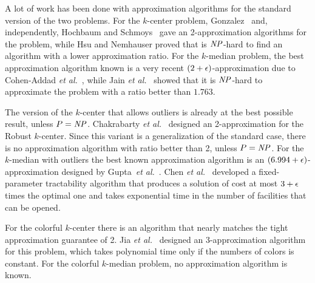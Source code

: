 \documentclass[12pt]{article}
\begin{document}
A lot of work has been done with approximation algorithms for the standard version of the two problems.
For the $k$-center problem, Gonzalez~\cite{G1985} and, independently, Hochbaum and Schmoys~\cite{HS1985} gave an 2-approximation algorithms for the problem, while Hsu and Nemhauser proved that is $\mathit{NP}$-hard to find an algorithm with a lower approximation ratio.
For the $k$-median problem, the best approximation algorithm known is a very recent $(2 + \epsilon)$-approximation due to Cohen-Addad \emph{et al.}~\cite{CGLS2025}, while Jain \emph{et al.}~\cite{JMS2002} showed that it is $\mathit{NP}$-hard to approximate the problem with a ratio better than $1.763$.

The version of the $k$-center that allows outliers is already at the best possible result, unless $P=\mathit{NP}$. 
Chakrabarty \emph{et al.}~\cite{CGK2020} designed an 2-approximation for the Robust $k$-center. 
Since this variant is a generalization of the standard case, there is no approximation algorithm with ratio better than 2, unless $P = \mathit{NP}$. 
For the $k$-median with outliers the best known approximation algorithm is an $(6.994 + \epsilon)$-approximation designed by Gupta~\emph{et al.}~\cite{GMZ2021}.
Chen \emph{et al.}~\cite{CHXXZ2024} developed a fixed-parameter tractability algorithm that produces a solution of cost at most $3 + \epsilon$ times the optimal one and takes exponential time in the number of facilities that can be opened.

For the colorful $k$-center there is an algorithm that nearly matches the tight approximation guarantee of 2. Jia \emph{et al.}~\cite{JSS2020} designed an 3-approximation algorithm for this problem, which takes polynomial time only if the numbers of colors is constant. For the colorful $k$-median problem, no approximation algorithm is known.

\end{document}
